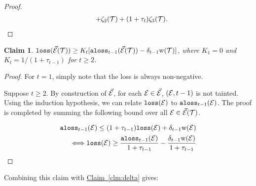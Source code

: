 \documentclass{acmsmall}
\newtheorem{claim}[theorem]{Claim}
\newcommand{\cD}{{\cal D}}
\newcommand{\cE}{{\cal E}}
\newcommand{\cF}{{\cal F}}
\newcommand{\cL}{{\cal L}}
\newcommand{\cT}{{\cal T}}
\newcommand{\Clm}[1]{\hyperref[clm:#1]{Claim~\ref*{clm:#1}}} %
\newcommand{\lis}{{\tt lis}}
\newcommand{\loss}{{\tt loss}}
\newcommand{\alis}{{\tt alis}}
\newcommand{\aloss}{{\tt aloss}}
\newcommand{\kappaest}{\widehat{\kappa}}
\newcommand{\width}{{\bf {\rm  w}}}
\newcommand{\errorterm}{\zeta}
\begin{document}
\begin{proof}
\begin{eqnarray*}
&&+\errorterm_2(\cT)+(1+\tau_t)\errorterm_3(\cT).
\end{eqnarray*}
%
\end{proof}

\begin{claim}
$\loss(\vec{\cE}(\cT)) \geq K_t[\aloss_{t-1}(\vec{\cE}(\cT))-\delta_{t-1} \width(\cT)]$, where
$K_1=0$ and $K_t = 1/(1+\tau_{t-1})$ for $t \geq 2$.
\end{claim}

\begin{proof} For $t=1$, simply note that the loss is always non-negative.

Suppose $t \geq 2$.
By construction of $\vec{\cE}$, for each $\cE \in \vec{\cE}$, $(\cE,t-1)$ is not tainted.
Using the induction hypothesis, we can relate $\loss(\cE)$ to $\aloss_{t-1}(\cE)$.
The proof is completed by summing the following bound over all $\cE \in \vec{\cE}(\cT)$.

\begin{eqnarray*}
\aloss_{t-1}(\cE) \leq (1+\tau_{t-1}) \loss(\cE) + \delta_{t-1} \width(\cE) \\
\Longleftrightarrow \loss(\cE) \geq \frac{\aloss_{t-1}(\cE)}{1+\tau_{t-1}} - \frac{\delta_{t-1} \width(\cE)}{1+ \tau_{t-1}}
\end{eqnarray*}
\end{proof}
Combining this claim with \Clm{delta} gives:
\end{document}
